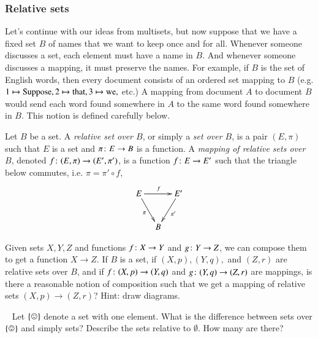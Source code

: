 \subsubsection{Relative sets}\label{sec:relative sets}

Let's continue with our ideas from multisets, but now suppose that we have a fixed set $B$ of names that we want to keep once and for all. Whenever someone discusses a set, each element must have a name in $B$. And whenever someone discusses a mapping, it must preserve the names. For example, if $B$ is the set of English words, then every document consists of an ordered set mapping to $B$ (e.g. $1\mapsto \textrm{Suppose}, 2\mapsto\textrm{that}, 3\mapsto\textrm{we},$ etc.) A mapping from document $A$ to document $B$ would send each word found somewhere in $A$ to the same word found somewhere in $B$. This notion is defined carefully below.

\begin{definition}\label{def:relative sets}

Let $B$ be a set. A {\em relative set over $B$}, or simply a {\em set over $B$}, is a pair $(E,\pi)$ such that $E$ is a set and $\pi\colon E\rightarrow B$ is a function. A {\em mapping of relative sets over $B$}, denoted $f\colon (E,\pi)\rightarrow(E',\pi')$, is a function $f\colon E\rightarrow E'$ such that the triangle below commutes, i.e. $\pi=\pi'\circ f$,
$$
\xymatrix@=10pt{E\ar[rr]^f\ar[rdd]_{\pi}&&E'\ar[ldd]^{\pi'}\\\\&B
}
$$

\end{definition}

\begin{exercise}
Given sets $X,Y,Z$ and functions $f\colon X\rightarrow Y$ and $g\colon Y\rightarrow Z$, we can compose them to get a function $X\to Z$. If $B$ is a set, if $(X,p), (Y,q),$ and $(Z,r)$ are relative sets over $B$, and if $f\colon (X,p)\rightarrow (Y,q)$ and $g\colon (Y,q)\rightarrow (Z,r)$ are mappings, is there a reasonable notion of composition such that we get a mapping of relative sets $(X,p)\to (Z,r)$? Hint: draw diagrams.
\end{exercise}

\begin{exercise}~
\sexc Let $\singleton$ denote a set with one element. What is the difference between sets over $\singleton$ and simply sets?
\next Describe the sets relative to $\emptyset$. How many are there?
\endsexc
\end{exercise}

